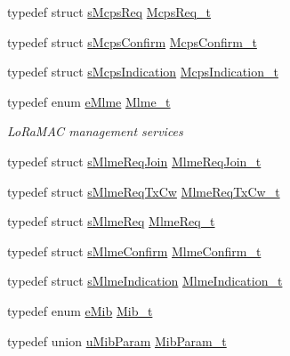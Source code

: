 \begin{DoxyCompactItemize}
\item 
typedef struct \mbox{\hyperlink{structs_mcps_req}{s\+Mcps\+Req}} \mbox{\hyperlink{group___l_o_r_a_m_a_c_ga038e0fe5eecc1fc4e8165eace8e2e683}{Mcps\+Req\+\_\+t}}
\item 
typedef struct \mbox{\hyperlink{structs_mcps_confirm}{s\+Mcps\+Confirm}} \mbox{\hyperlink{group___l_o_r_a_m_a_c_ga925536babf8abe83918a19f5ae88bd44}{Mcps\+Confirm\+\_\+t}}
\item 
typedef struct \mbox{\hyperlink{structs_mcps_indication}{s\+Mcps\+Indication}} \mbox{\hyperlink{group___l_o_r_a_m_a_c_ga202591b6553d63fae89bd42787496616}{Mcps\+Indication\+\_\+t}}
\item 
typedef enum \mbox{\hyperlink{group___l_o_r_a_m_a_c_ga320f4c08fe99747b08463689be624f7b}{e\+Mlme}} \mbox{\hyperlink{group___l_o_r_a_m_a_c_ga663544b83d50ec3518608be495896809}{Mlme\+\_\+t}}
\begin{DoxyCompactList}\small\item\em Lo\+Ra\+M\+AC management services \end{DoxyCompactList}\item 
typedef struct \mbox{\hyperlink{structs_mlme_req_join}{s\+Mlme\+Req\+Join}} \mbox{\hyperlink{group___l_o_r_a_m_a_c_gab12f7f7d9bdfb8067d56f7c9f1297d95}{Mlme\+Req\+Join\+\_\+t}}
\item 
typedef struct \mbox{\hyperlink{structs_mlme_req_tx_cw}{s\+Mlme\+Req\+Tx\+Cw}} \mbox{\hyperlink{group___l_o_r_a_m_a_c_gab71a9931686ff623fa01ceecc61f1986}{Mlme\+Req\+Tx\+Cw\+\_\+t}}
\item 
typedef struct \mbox{\hyperlink{structs_mlme_req}{s\+Mlme\+Req}} \mbox{\hyperlink{group___l_o_r_a_m_a_c_ga5a32f5920a7a3d04435c142be7f38b19}{Mlme\+Req\+\_\+t}}
\item 
typedef struct \mbox{\hyperlink{structs_mlme_confirm}{s\+Mlme\+Confirm}} \mbox{\hyperlink{group___l_o_r_a_m_a_c_ga73d9d9e11e282a6c258c4d22865fe824}{Mlme\+Confirm\+\_\+t}}
\item 
typedef struct \mbox{\hyperlink{structs_mlme_indication}{s\+Mlme\+Indication}} \mbox{\hyperlink{group___l_o_r_a_m_a_c_ga3003d863a5b49c5f3371ffa5cabb1a0b}{Mlme\+Indication\+\_\+t}}
\item 
typedef enum \mbox{\hyperlink{group___l_o_r_a_m_a_c_ga32ea83d13a3f5bb4b3ec2ace2319ab61}{e\+Mib}} \mbox{\hyperlink{group___l_o_r_a_m_a_c_gaf17bd3de9ec75e4954be9a070cd8ddf9}{Mib\+\_\+t}}
\item 
typedef union \mbox{\hyperlink{unionu_mib_param}{u\+Mib\+Param}} \mbox{\hyperlink{group___l_o_r_a_m_a_c_gae9f2411f44447849f5b36bcaca1feb5c}{Mib\+Param\+\_\+t}}

\end{DoxyCompactItemize}
